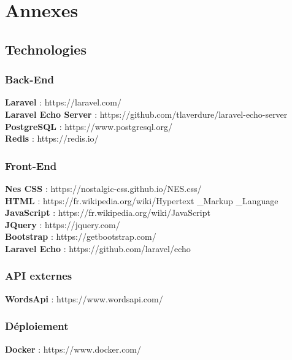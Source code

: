 \documentclass{tnreport}
\begin{document}
\listoffigures

\cleardoublepage

\appendix
\part*{Annexes}

\cleardoublepage

\chapter{Technologies}

\section{Back-End}
\textbf{Laravel} : https://laravel.com/\\
\textbf{Laravel Echo Server} : https://github.com/tlaverdure/laravel-echo-server\\
\textbf{PostgreSQL} : https://www.postgresql.org/\\
\textbf{Redis} : https://redis.io/\\

\section{Front-End}
\textbf{Nes CSS} : https://nostalgic-css.github.io/NES.css/\\
\textbf{HTML} : https://fr.wikipedia.org/wiki/Hypertext \_Markup \_Language\\
\textbf{JavaScript} : https://fr.wikipedia.org/wiki/JavaScript\\
\textbf{JQuery} : https://jquery.com/\\
\textbf{Bootstrap} : https://getbootstrap.com/\\
\textbf{Laravel Echo} : https://github.com/laravel/echo\\

\section{API externes}
\textbf{WordsApi} : https://www.wordsapi.com/\\

\section{Déploiement}
\textbf{Docker} : https://www.docker.com/\\
\end{document}
